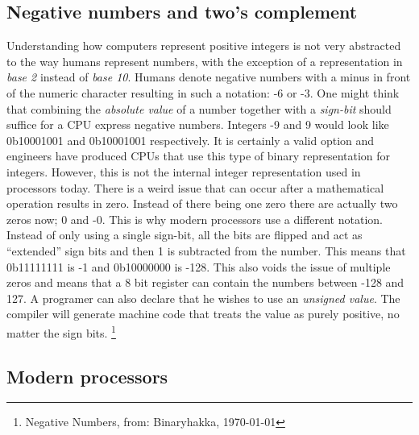 \subsection{Negative numbers and two's complement}

Understanding how computers represent positive integers is not very abstracted to the way humans
represent numbers, with the exception of a representation in \textit{base 2} instead of \textit{base 10}. Humans
denote negative numbers with a minus in front of the numeric character resulting in such a notation: 
-6 or -3. One might think that combining the \textit{absolute value} of a number together with a \textit{sign-bit}
should suffice for a CPU express negative numbers. Integers -9 and 9 would look like 0b10001001 and
0b10001001 respectively. It is certainly a valid option and engineers have produced
CPUs that use this type of binary representation for integers. However, this is not the 
internal integer representation used in processors today. There is a weird issue that can occur after
a mathematical operation results in zero. Instead of there being one zero there are actually two 
zeros now; 0 and -0. This is why modern processors use a different notation. Instead of only using a
single sign-bit, all the bits are flipped and act as “extended” sign bits and then 1 is subtracted 
from the number. This means that 0b11111111 is -1 and 0b10000000 is -128. This also voids the issue 
of multiple zeros and means that a 8 bit register can contain the numbers between -128 and 127. 
A programer can also declare that he wishes to use an \textit{unsigned value}. The compiler will generate
machine code that treats the value as purely positive, no matter the sign bits. \footnote{Negative Numbers, from: Binaryhakka, \today }



\subsection{Modern processors}

